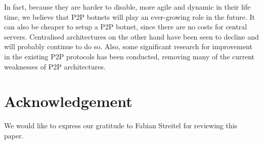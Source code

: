 \documentclass{llncs}
\begin{document}
In fact, because they are harder to disable, more agile and dynamic in
their life time, we believe that P2P botnets will play an ever-growing
role in the future. It can also be cheaper to setup a P2P botnet,
since there are no costs for central servers. Centralised
architectures on the other hand have been seen to decline and will
probably continue to do so. Also, some significant research for
improvement in the existing P2P protocols has been conducted,
removing many of the current weaknesses of P2P architectures.

\section*{Acknowledgement}
We would like to express our gratitude to Fabian Streitel for
reviewing this paper.



\end{document}
